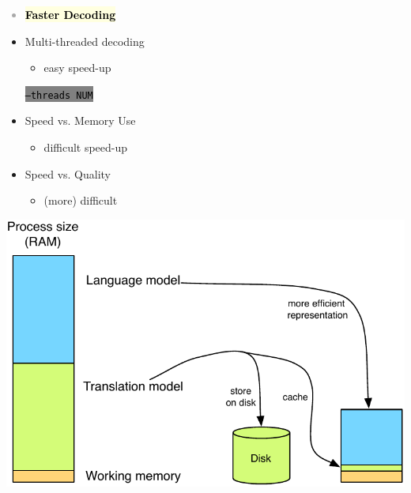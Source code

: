 \documentclass[landscape]{uedslides2C}
\newcommand{\currenttopic}[1]{\colorbox{lightyellow}{\textcolor{black}{\bf #1}}}
\newcommand{\littlecode}[1]{\colorbox{gray}{\textcolor{black}{\small \tt #1}}}
\begin{document}

\vspace{-5mm}
\textcolor{darkgrey}{
\begin{itemize} \itemsep -1mm
\item \currenttopic{Faster Decoding}
\end{itemize}
}



\vspace{15mm}
\begin{itemize}
\item Multi-threaded decoding 
  \begin{itemize}
  \item easy speed-up
  \end{itemize}
\begin{center}
\littlecode{--threads NUM}
\end{center}

\item Speed vs. Memory Use
  \begin{itemize}
  \item difficult speed-up
  \end{itemize}

\item Speed vs. Quality
  \begin{itemize}
  \item (more) difficult
  \end{itemize}

\end{itemize}


\begin{center} 
\includegraphics[scale=1.4]{less-memory.pdf}
\end{center}
\end{document}
